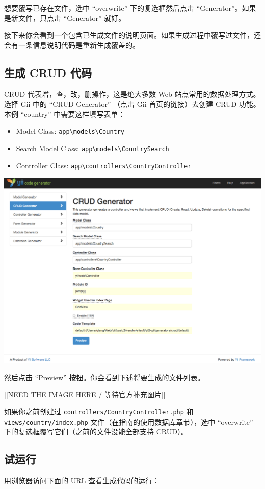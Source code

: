 想要覆写已存在文件，选中 “overwrite” 下的复选框然后点击 “Generator”。如果是新文件，只点击 “Generator” 就好。

接下来你会看到一个包含已生成文件的说明页面。如果生成过程中覆写过文件，还会有一条信息说明代码是重新生成覆盖的。

\subsection{生成 CRUD 代码 \label{start-gii.md::generating-crud}}
CRUD 代表增，查，改，删操作，这是绝大多数 Web 站点常用的数据处理方式。选择 Gii 中的 “CRUD Generator” （点击 Gii 首页的链接）去创建 CRUD 功能。本例 “country” 中需要这样填写表单：

\begin{itemize}
\item Model Class: \lstinline|app\models\Country|
\item Search Model Class: \lstinline|app\models\CountrySearch|
\item Controller Class: \lstinline|app\controllers\CountryController|
\end{itemize}
\noindent\includegraphics[width=\textwidth]{images/start-gii-crud.png}

然后点击 “Preview” 按钮。你会看到下述将要生成的文件列表。

[[NEED THE IMAGE HERE / 等待官方补充图片]]

如果你之前创建过 \lstinline|controllers/CountryController.php| 和 \lstinline|views/country/index.php| 文件（在指南的使用数据库章节），选中 “overwrite” 下的复选框覆写它们（之前的文件没能全部支持 CRUD）。

\subsection{试运行 \label{start-gii.md::trying-it-out}}
用浏览器访问下面的 URL 查看生成代码的运行：

